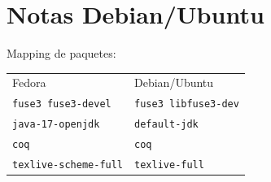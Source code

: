 \section*{Notas Debian/Ubuntu}

Mapping de paquetes:

\begin{tabular}{ll}
  Fedora & Debian/Ubuntu \\
  \texttt{fuse3 fuse3-devel} & \texttt{fuse3 libfuse3-dev} \\
  \texttt{java-17-openjdk} & \texttt{default-jdk} \\
  \texttt{coq} & \texttt{coq} \\
  \texttt{texlive-scheme-full} & \texttt{texlive-full} \\
\end{tabular}

